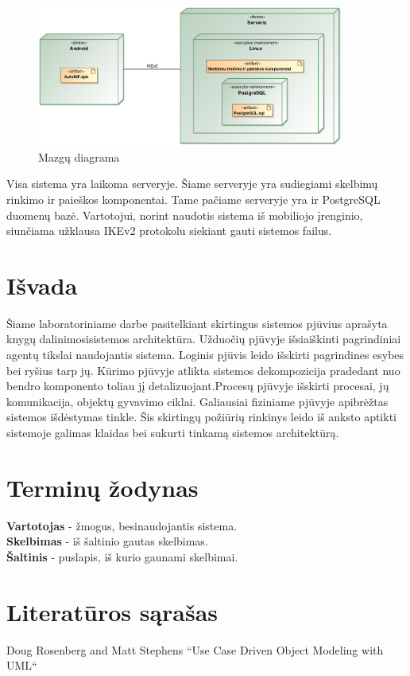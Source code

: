 \documentclass[12pt]{article}
\begin{document}
	\begin{figure}[h]
		\begin{center}
			\includegraphics[width=0.9\textwidth]{Mazgai.eps}
			\caption{Mazgų diagrama\label{Cube}}
		\end{center}
	\end{figure}
	
	Visa sistema yra laikoma serveryje. Šiame serveryje yra sudiegiami skelbimų rinkimo ir paieškos komponentai. Tame pačiame serveryje yra ir PostgreSQL duomenų bazė. Vartotojui, norint naudotis sistema iš mobiliojo įrenginio, siunčiama užklausa IKEv2 protokolu siekiant gauti sistemos failus.
	\pagebreak
	
	
	\section{Išvada}
	Šiame laboratoriniame darbe pasitelkiant skirtingus sistemos pjūvius aprašyta knygų dalinimosisistemos architektūra. Užduočių pjūvyje išsiaiškinti pagrindiniai agentų tikslai naudojantis sistema. Loginis pjūvis leido išskirti pagrindines esybes bei ryšius tarp jų. Kūrimo pjūvyje atlikta sistemos dekompozicija pradedant nuo bendro komponento toliau jį detalizuojant.Procesų pjūvyje išskirti procesai, jų komunikacija, objektų gyvavimo ciklai. Galiausiai fiziniame pjūvyje apibrėžtas sistemos išdėstymas tinkle. Šis skirtingų požiūrių rinkinys leido iš anksto aptikti sistemoje galimas klaidas bei sukurti tinkamą sistemos architektūrą.
	\pagebreak

	\section{Terminų žodynas}
	
	\bigskip
	\textbf{Vartotojas} - žmogus, besinaudojantis sistema.\\
	
	\textbf{Skelbimas} - iš šaltinio gautas skelbimas.\\
	
	\textbf{Šaltinis} - puslapis, iš kurio gaunami skelbimai.\\
	\pagebreak

	\section{Literatūros sąrašas}
	
	Doug Rosenberg and Matt Stephens “Use Case Driven Object Modeling with UML“
\end{document}
